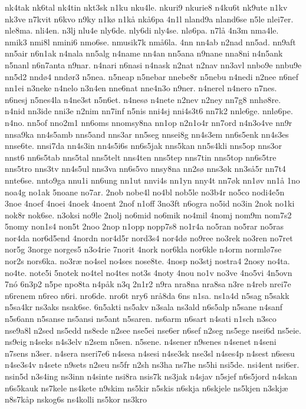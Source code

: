 {nk4tak
nk6tal
nk4tin
nkt3sk
n1ku
nku4le.
nkuri9
nkurie8
n4ku6t
nk9ute
n1kv
nk3ve
n7kvit
n6kvo
n9ky
n1kø
n1kå
nkå6pa
4n1l
nland9a
nland6se
n5le
nlei7er.
nle8ma.
nli4en.
n3lj
nlu4e
nly6de.
nly6di
nly4se.
nlø6pa.
n7lå
4n3m
nma4le.
nmik3
nmi8l
nmini6
nmo6se.
nmusik7k
nmå6la.
4nn
nn4ab
n2nad
nn5ad.
nn9aft
nn5air
n6n1ak
n4nala
nn5alg
n4name
nn4an
nn5ana
n9nane
nna8ni
n4n5ank
n5nanl
n6n7anta
n9nar.
n4nari
n6nasi
n4nask
n2nat
n2nav
nn3avl
nnbo9e
nnbu9e
nn5d2
nndø4
nndør3
n5nea.
n5neap
n5nebar
nnebe8r
n5nebu
n4nedi
n2nee
n6nef
nn1ei
n3neke
n4nelo
n3n4en
nne6nat
nne4n3o
n9ner.
n4nerel
n4nero
n7nes.
n6nesj
n5nes4la
n4ne3st
n5n6et.
n4nesø
n4nete
n2nev
n2ney
nn7g8
nnhø8re.
n4nid
nn3ide
nni3e
n2nim
nn7inf
n5nis
nni4sj
nni4s3t6
nn7k2
nnle6ge.
nnlø6pe.
n4no.
nn5of
nno2m1
nn6oms
nnomsy8na
nn1op
n2n1o4r
nn7ord
n4n3o4ve
nn9r
nnsa9ka
nn4s5amb
nns5and
nns3ar
nn5seg
nnsei8g
nn4s3em
nn6s5enk
nn4s3es
nnse6te.
nnsi7da
nn4s3in
nn4s5i6s
nn6s5jak
nns5kan
nn5s4kli
nns5op
nns3or
nnst6
nn6s5tab
nns5tal
nns5telt
nns4ten
nns5tep
nns7tin
nns5top
nn6s5tre
nns5tro
nns3tv
nn4s5ul
nns3va
nn6s5vo
nnsy8na
nn2sø
nns3øk
nn3så5r
nn7t4
nnte6se.
nnto9ga
nnu1i
nn6ung
nn1ut
nnvi4s
nn1yn
nny4t
nn7øk
nn1øv
nn1å
1no
noa4g
no1ak
5noane
no7ar.
2nob
nobe4l
no4bl
nob5le
no3b4r
no5co
nodi4e5n
3noe
4noef
4noei
4noek
4noent
2nof
n1off
3no3ft
n6ogra
no5id
no3in
2nok
no1ki
nok8r
nok6se.
n3oksi
no9le
2nolj
no6mid
no6mik
no4mil
4nomj
nom9m
nom7s2
5nomy
non1s4
non5t
2noo
2nop
n1opp
nopp7s8
no1r4a
no5ran
no5rar
no5ras
nor4da
nor6d5end
4nordn
nor4d5r
nord3s4
nor4dø
no9ree
no3rek
no3ren
no7ret
nor5g
3norge
norges5
n3o4rie
7norit
4nork
nor6kla
nor6kle
n4orm
normlø7se
nor2s
nors6ka.
no3ræ
no4sel
no4ses
nose8te.
4nosp
no3stj
nostra4
2nosy
no4ta.
no4te.
note5i
5notek
no4tel
no4tes
not3s
4noty
4nou
no1v
no3ve
4no5vi
4n5ovn
7nó
6n3p2
n5pe
npo8ta
n4påk
n3q
2n1r2
n9ra
nra8na
nra8sa
n3re
n4reb
nrei7e
n6renem
n6reo
n6ri.
nro6de.
nro6t
nry6
nrå8da
6ns
n1sa.
ns1a4d
n5sag
n5sakk
n5sa4kr
ns3aks
nsak6se.
6n5akti
ns5akv
n3sala
ns3ald
n6s5alp
n5sane
n4sanf
n5s6ann
n5sanse
ns5ansi
ns5ant
n5saren.
ns6arm
n6sart
n4sati
n1sch
n3sco
nse9a8l
n2sed
ns5edd
ns8ede
n2see
nse5ei
nse6er
n6sef
n2seg
ns5ege
nsei6d
ns5eie.
ns9eig
n4seks
n4s3elv
n2sem
n5sen.
n5sene.
n4sener
n9senes
n4senet
n4seni
n7sens
n3ser.
n4sera
nseri7e6
n4sesa
n4sesi
n4se3sk
nse3sl
n4ses4p
n4sest
n6sesu
n4se3s4v
n4sete
n9sets
n2seu
ns5fr
n2sh
ns3ha
ns7he
ns5hi
nsi5de.
nsi4ent
nsi6er.
nsin5d
n3s4ing
ns3inn
n4sinte
nsi8ra
nsis7k
ns3jak
n4sjav
n5sjef
n6s5jord
n4skan
n6s5kauk
ns7kele
ns4kete
n9skim
ns5kir
n5skis
n6skja
n6skjele
ns5kjen
n3skjæ
n8s7kåp
nskog6s
ns4kolli
ns5kor
ns3kro
}
